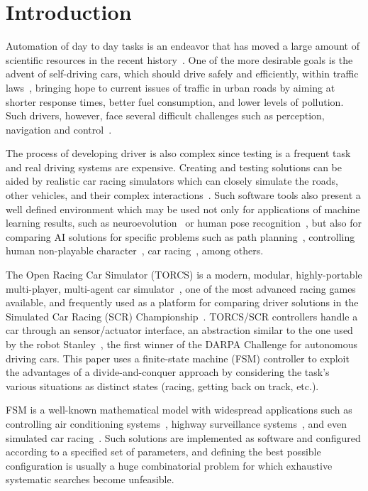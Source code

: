 \section{Introduction}\label{sec:1}
Automation of day to day tasks is an endeavor that has moved a large amount of scientific resources in the recent history~\cite{INDUS,APPLI}. One of the more desirable goals is the advent of self-driving cars, which should drive safely and efficiently, within traffic laws~\cite{SAFE,AUTOM}, bringing hope to current issues of traffic in urban roads by aiming at shorter response times, better fuel consumption, and lower levels of pollution. Such drivers, however, face several difficult challenges such as perception, navigation and control~\cite{6179503}.

The process of developing driver is also complex since testing is a frequent task and real driving systems are expensive. Creating and testing solutions can be aided by realistic car racing simulators which can closely simulate the roads, other vehicles, and their complex interactions~\cite{caldeira2013torcs}. Such software  tools also present a well defined environment which may be used not only for applications of machine learning results, such as neuroevolution~\cite{5482132} or human pose recognition~\cite{Shotton:2011}, but also for comparing AI solutions for specific problems such as path planning~\cite{deFreitas:2012}, controlling human non-playable character~\cite{simon2008}, car racing~\cite{2009}, among others.

The Open Racing Car Simulator (TORCS) is a modern, modular, highly-portable multi-player, multi-agent car simulator~\cite{SIMUTORCS}, one of the most advanced racing games available, and frequently used as a platform for comparing driver solutions in the Simulated Car Racing (SCR) Championship~\cite{2009,Loiacono:2012:LEA:2212908.2212953}. TORCS/SCR controllers handle a car through an sensor/actuator interface, an abstraction similar to the one used by the robot Stanley~\cite{Thrun2006}, the first winner of the DARPA Challenge for autonomous driving cars. This paper uses a finite-state machine (FSM) controller to exploit the advantages of a divide-and-conquer approach by considering the task's various situations as distinct states (racing, getting back on track, etc.).

FSM is a well-known mathematical model with widespread applications such as controlling air conditioning systems~\cite{BERNARD}, highway surveillance systems~\cite{DOHYUN}, and even simulated car racing~\cite{DIEGO}. Such solutions are implemented as software and configured according to a specified set of parameters, and defining the best possible configuration is usually a huge combinatorial problem for which exhaustive systematic searches become unfeasible.


